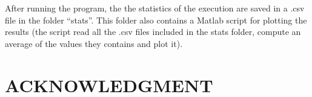 \documentclass[a4paper, 10pt, conference]{ieeeconf}      %
\begin{document}
After running the program, the the statistics of the execution are saved in a .csv file in the folder ``stats''. This folder also contains a Matlab script for plotting the results (the script read all the .csv files included in the stats folder, compute an average of the values they contains and plot it). 

\section*{ACKNOWLEDGMENT}


\printbibliography
\end{document}
